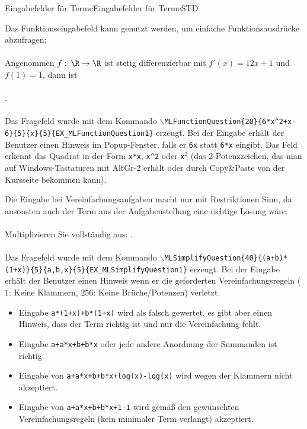 \begin{MXContent}{Eingabefelder für Terme}{Eingabefelder für Terme}{STD}
\begin{MExample}
Das Funktionseingabefeld kann genutzt werden, um einfache Funktionsausdrücke abzufragen:
\ \\ \ \\
Angenommen $f:\:\R\rightarrow\R$ ist stetig differenzierbar mit $f'(x)=12x+1$ und $f(1)=1$, dann ist\ \\ \ \\
.
\ \\ \ \\
Das Fragefeld wurde mit dem Kommando \texttt{$\backslash$MLFunctionQuestion\{20\}\{6*x\^{}2+x-6\}\{5\}\{x\}\{5\}\{EX\_MLFunctionQuestion1\}} erzeugt. Bei der Eingabe erhält der Benutzer einen
Hinweis im Popup-Fenster, falls er \texttt{6x} statt \texttt{6*x} eingibt. Das Feld erkennt das Quadrat in der Form \texttt{x*x}, \texttt{x\^{}2} oder \texttt{x}$^2$ (das 2-Potenzzeichen, das
man auf Windows-Tastaturen mit AltGr-2 erhält oder durch Copy\&Paste von der Kursseite bekommen kann).
\end{MExample}

\begin{MExample}
Die Eingabe bei Vereinfachungsaufgaben macht nur mit Restriktionen Sinn, da ansonsten auch der Term aus der Aufgabenstellung eine richtige Lösung wäre:
\ \\ \ \\
Multiplizieren Sie vollständig aus: .
\ \\ \ \\
Das Fragefeld wurde mit dem Kommando \texttt{$\backslash$MLSimplifyQuestion\{40\}\{(a+b)*(1+x)\}\{5\}\{a,b,x\}\{5\}\{EX\_MLSimplifyQuestion1\}} erzeugt.
Bei der Eingabe erhält der Benutzer einen Hinweis wenn er die geforderten Vereinfachungsregeln ($1$: Keine Klammern, $256$: Keine Brüche/Potenzen) verletzt.
\begin{itemize}
\item{Eingabe \texttt{a*(1+x)+b*(1+x)} wird als falsch gewertet, es gibt aber einen Hinweis, dass der Term richtig ist und nur die Vereinfachung fehlt.}
\item{Eingabe \texttt{a+a*x+b+b*x} oder jede andere Anordnung der Summanden ist richtig.}
\item{Eingabe von \texttt{a+a*x+b+b*x+log(x)-log(x)} wird wegen der Klammern nicht akzeptiert.}
\item{Eingabe von \texttt{a+a*x+b+b*x+1-1} wird gemäß den gewünschten Vereinfachungsregeln (kein minimaler Term verlangt) akzeptiert.}
\end{itemize}
\end{MExample}


\end{MXContent}
